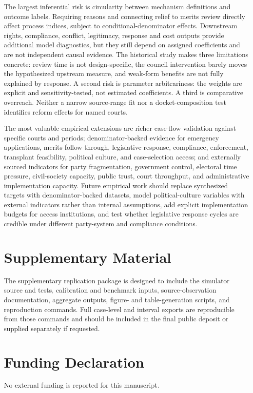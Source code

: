 \documentclass[
  journal=small,
  manuscript=research-article,
  year=2026
]{cup-journal}
\begin{document}
The largest inferential risk is circularity between mechanism definitions and outcome labels. Requiring reasons and connecting relief to merits review directly affect process indices, subject to conditional-denominator effects. Downstream rights, compliance, conflict, legitimacy, response and cost outputs provide additional model diagnostics, but they still depend on assigned coefficients and are not independent causal evidence. The historical study makes three limitations concrete: review time is not design-specific, the council intervention barely moves the hypothesized upstream measure, and weak-form benefits are not fully explained by response. A second risk is parameter arbitrariness: the weights are explicit and sensitivity-tested, not estimated coefficients. A third is comparative overreach. Neither a narrow source-range fit nor a docket-composition test identifies reform effects for named courts.

The most valuable empirical extensions are richer case-flow validation against specific courts and periods; denominator-backed evidence for emergency applications, merits follow-through, legislative response, compliance, enforcement, transplant feasibility, political culture, and case-selection access; and externally sourced indicators for party fragmentation, government control, electoral time pressure, civil-society capacity, public trust, court throughput, and administrative implementation capacity. Future empirical work should replace synthesized targets with denominator-backed datasets, model political-culture variables with external indicators rather than internal assumptions, add explicit implementation budgets for access institutions, and test whether legislative response cycles are credible under different party-system and compliance conditions.

\section*{Supplementary Material}
The supplementary replication package is designed to include the simulator source and tests, calibration and benchmark inputs, source-observation documentation, aggregate outputs, figure- and table-generation scripts, and reproduction commands. Full case-level and interval exports are reproducible from those commands and should be included in the final public deposit or supplied separately if requested.

\section*{Funding Declaration}
No external funding is reported for this manuscript.
\end{document}
